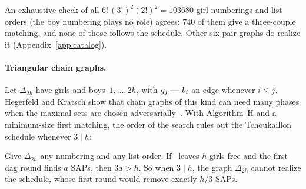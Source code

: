 An exhaustive check of all $6!\,(3!)^2(2!)^2=103680$ girl numberings and
list orders (the boy numbering plays no role) agrees: 740 of them give a
three-couple~ matching, and none of those follows the schedule. Other
six-pair graphs do realize it (Appendix~\ref{app:catalog}).

\paragraph{Triangular chain graphs.}
Let $\Delta_{2h}$ have girls and boys~$1,\ldots,2h$, with $g_j\sg b_i$ an
edge whenever $i\le j$. Hegerfeld and Kratsch show that chain graphs of
this kind can need many phases when the maximal sets are chosen
adversarially~\cite[Section~5.3]{HegerfeldKratsch}. With Algorithm~H and a
minimum-size first matching, the order of the search rules out the
Tchoukaillon schedule whenever $3\mid h$:

\begin{proposition}
\label{prop:chain}
Give $\Delta_{2h}$ any numbering and any list order. If~ leaves $h$ girls
free and the first dag round finds $a$ SAPs, then $3a>h$. So when $3\mid h$,
the graph $\Delta_{2h}$ cannot realize the schedule, whose first round would
remove exactly $h/3$ SAPs.
\end{proposition}

